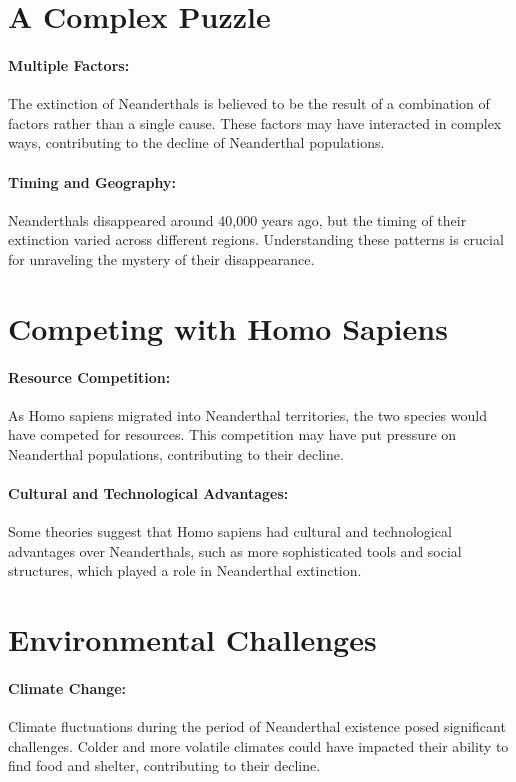 \documentclass[a4paper,12pt]{book}
\begin{document}
\section*{A Complex Puzzle}

\paragraph{Multiple Factors:}
The extinction of Neanderthals is believed to be the result of a combination of factors rather than a single cause. These factors may have interacted in complex ways, contributing to the decline of Neanderthal populations.

\paragraph{Timing and Geography:}
Neanderthals disappeared around 40,000 years ago, but the timing of their extinction varied across different regions. Understanding these patterns is crucial for unraveling the mystery of their disappearance.

\section*{Competing with Homo Sapiens}

\paragraph{Resource Competition:}
As Homo sapiens migrated into Neanderthal territories, the two species would have competed for resources. This competition may have put pressure on Neanderthal populations, contributing to their decline.

\paragraph{Cultural and Technological Advantages:}
Some theories suggest that Homo sapiens had cultural and technological advantages over Neanderthals, such as more sophisticated tools and social structures, which played a role in Neanderthal extinction.

\section*{Environmental Challenges}

\paragraph{Climate Change:}
Climate fluctuations during the period of Neanderthal existence posed significant challenges. Colder and more volatile climates could have impacted their ability to find food and shelter, contributing to their decline.
\end{document}
